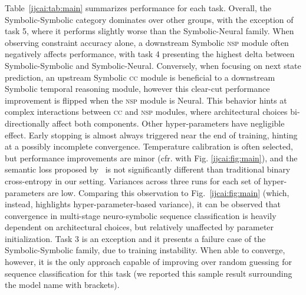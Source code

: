 %
%
%
Table~\ref{ijcai:tab:main} summarizes performance for each task. %
%
Overall, the Symbolic-Symbolic category dominates over other groups, with the exception of task 5, where it performs slightly worse than the Symbolic-Neural family. When observing constraint accuracy alone, a downstream Symbolic \textsc{nsp} module often negatively affects performance, with task 4 presenting the highest delta between Symbolic-Symbolic and Symbolic-Neural.
Conversely, when focusing on next state prediction, an upstream Symbolic \textsc{cc} module is beneficial to a downstream Symbolic temporal reasoning module, however this clear-cut performance improvement is flipped when the \textsc{nsp} module is Neural. This behavior hints at complex interactions between \textsc{cc} and \textsc{nsp} modules, where architectural choices bi-directionally affect both components.
%
Other hyper-parameters have negligible effect. 
Early stopping is almost always triggered near the end of training, hinting at a possibly incomplete convergence. Temperature calibration is often selected, but performance improvements are minor (cfr. with Fig. \ref{ijcai:fig:main}), and the semantic loss proposed by~\cite{umili2023grounding} is not significantly different than traditional binary cross-entropy in our setting.
%
Variances across three runs for each set of hyper-parameters are low. Comparing this observation to Fig.~\ref{ijcai:fig:main} (which, instead, highlights hyper-parameter-based variance), it can be observed that convergence in multi-stage neuro-symbolic sequence classification is heavily dependent on architectural choices, but relatively unaffected by parameter initialization.
%
Task 3 is an exception and it presents a failure case of the Symbolic-Symbolic family, due to training instability. When able to converge, however, it is the only approach capable of improving over random guessing for sequence classification for this task (we reported this sample result surrounding the model name with brackets).


